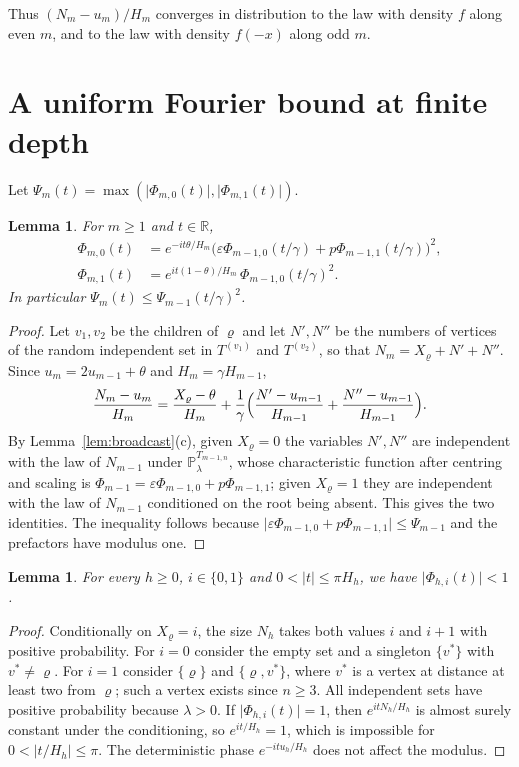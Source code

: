 \documentclass{amsart}
\newtheorem{lemma}[theorem]{Lemma}
\theoremstyle{definition}
\theoremstyle{remark}
\numberwithin{equation}{section}
\newcommand{\eps}{\varepsilon}
\newcommand{\Prob}{\mathbb{P}}
\newcommand{\R}{\mathbb{R}}
\newcommand{\abs}[1]{\lvert #1\rvert}
\begin{document}
Thus $(N_m-u_m)/H_m$ converges in distribution to the law with density $f$ along even $m$, and to the law with density $f(-x)$ along odd $m$.

\section{A uniform Fourier bound at finite depth}\label{sec:fourier}

Let $\Psi_m(t)=\max(\abs{\Phi_{m,0}(t)},\abs{\Phi_{m,1}(t)})$.

\begin{lemma}\label{lem:recursion}
For $m\ge1$ and $t\in\R$,
\begin{align*}
\Phi_{m,0}(t)&=e^{-it\theta/H_m}\bigl(\eps\Phi_{m-1,0}(t/\gamma)+p\Phi_{m-1,1}(t/\gamma)\bigr)^2,\\
\Phi_{m,1}(t)&=e^{it(1-\theta)/H_m}\,\Phi_{m-1,0}(t/\gamma)^2 .
\end{align*}
In particular $\Psi_m(t)\le\Psi_{m-1}(t/\gamma)^2$.
\end{lemma}

\begin{proof}
Let $v_1,v_2$ be the children of $\varrho$ and let $N',N''$ be the numbers of vertices of the random independent set in $T^{(v_1)}$ and $T^{(v_2)}$, so that $N_m=X_\varrho+N'+N''$. Since $u_m=2u_{m-1}+\theta$ and $H_m=\gamma H_{m-1}$,
\[
\frac{N_m-u_m}{H_m}=\frac{X_\varrho-\theta}{H_m}+\frac1\gamma\Bigl(\frac{N'-u_{m-1}}{H_{m-1}}+\frac{N''-u_{m-1}}{H_{m-1}}\Bigr).
\]
By Lemma~\ref{lem:broadcast}(c), given $X_\varrho=0$ the variables $N',N''$ are independent with the law of $N_{m-1}$ under $\Prob^{T_{m-1,n}}_\lambda$, whose characteristic function after centring and scaling is $\Phi_{m-1}=\eps\Phi_{m-1,0}+p\Phi_{m-1,1}$; given $X_\varrho=1$ they are independent with the law of $N_{m-1}$ conditioned on the root being absent. This gives the two identities. The inequality follows because $\abs{\eps\Phi_{m-1,0}+p\Phi_{m-1,1}}\le\Psi_{m-1}$ and the prefactors have modulus one.
\end{proof}

\begin{lemma}\label{lem:lattice}
For every $h\ge0$, $i\in\{0,1\}$ and $0<\abs t\le\pi H_h$, we have $\abs{\Phi_{h,i}(t)}<1$.
\end{lemma}

\begin{proof}
Conditionally on $X_\varrho=i$, the size $N_h$ takes both values $i$ and $i+1$ with positive probability. For $i=0$ consider the empty set and a singleton $\{v^*\}$ with $v^*\ne\varrho$. For $i=1$ consider $\{\varrho\}$ and $\{\varrho,v^*\}$, where $v^*$ is a vertex at distance at least two from $\varrho$; such a vertex exists since $n\ge3$. All independent sets have positive probability because $\lambda>0$. If $\abs{\Phi_{h,i}(t)}=1$, then $e^{itN_h/H_h}$ is almost surely constant under the conditioning, so $e^{it/H_h}=1$, which is impossible for $0<\abs{t/H_h}\le\pi$. The deterministic phase $e^{-itu_h/H_h}$ does not affect the modulus.
\end{proof}
\end{document}

